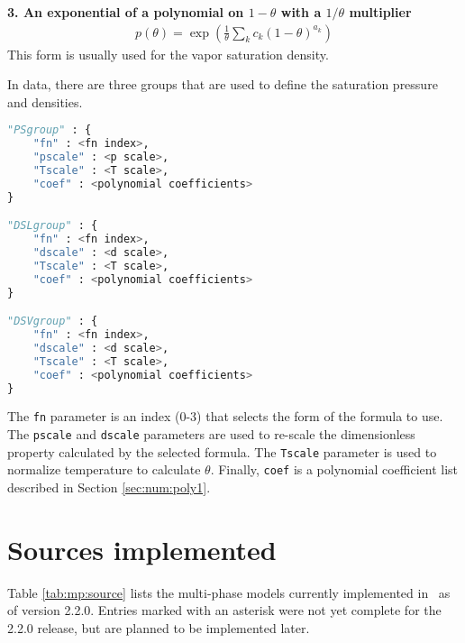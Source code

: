 {\bf 3. An exponential of a polynomial on $1-\theta$ with a $1/\theta$ multiplier}
\begin{align}
p(\theta) = \exp \left( \frac{1}{\theta} \sum_k c_k (1-\theta)^{a_k} \right)
\end{align}
This form is usually used for the vapor saturation density.

In data, there are three groups that are used to define the saturation pressure and densities.
\begin{lstlisting}[language=Python]
"PSgroup" : {
    "fn" : <fn index>,
    "pscale" : <p scale>,
    "Tscale" : <T scale>,
    "coef" : <polynomial coefficients>
}

"DSLgroup" : {
    "fn" : <fn index>,
    "dscale" : <d scale>,
    "Tscale" : <T scale>,
    "coef" : <polynomial coefficients>
}

"DSVgroup" : {
    "fn" : <fn index>,
    "dscale" : <d scale>,
    "Tscale" : <T scale>,
    "coef" : <polynomial coefficients>
}
\end{lstlisting}

The \texttt{fn} parameter is an index (0-3) that selects the form of the formula to use.  The \texttt{pscale} and \texttt{dscale} parameters are used to re-scale the dimensionless property calculated by the selected formula.  The \texttt{Tscale} parameter is used to normalize temperature to calculate $\theta$.  Finally, \texttt{coef} is a polynomial coefficient list described in Section \ref{sec:num:poly1}.

\section{Sources implemented}
Table \ref{tab:mp:source} lists the multi-phase models currently implemented in \PM\ as of version 2.2.0.  Entries marked with an asterisk were not yet complete for the 2.2.0 release, but are planned to be implemented later.

